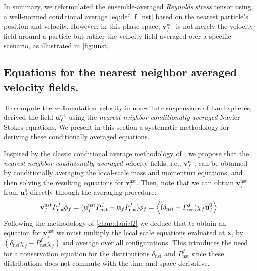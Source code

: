 In summary, we reformulated the ensemble-averaged \textit{Reynolds stress} tensor using a well-normed conditional average \eqref{eq:def_f_nst} based on the nearest particle's position and velocity. 
However, in this phase-space, $\textbf{v}_f^\text{nst}$ is not merely the velocity field around a particle but rather the velocity field averaged over a specific scenario, as illustrated in \ref{fig:unst}. 

\subsection{Equations for the nearest neighbor averaged velocity fields. }

To compute the sedimentation velocity in non-dilute suspensions of hard spheres, \citet[Appendix B]{zhang2021ensemble} derived the field $\textbf{u}_f^\text{nst}$ using the \textit{nearest neighbor conditionally averaged} Navier-Stokes equations. 
We present in this section a systematic methodology for deriving these conditionally averaged equations. 

Inspired by the classic conditional average methodology of \citet{hinch1977averaged}, we propose that the \textit{nearest neighbor conditionally averaged} velocity fields, i.e., $\textbf{v}_f^\text{nst}$, can be obtained by conditionally averaging the local-scale mass and momentum equations, and then solving the resulting equations for $\textbf{v}_f^\text{nst}$. 
Then, note that we can obtain $\textbf{v}_f^\text{nst}$ from $\textbf{u}_f^0$ directly through the averaging procedure: 
\begin{equation}
    \textbf{v}_f^\text{nst} P_\text{nst}^f\phi_f
    = 
    (\textbf{u}_f^\text{nst} P_\text{nst}^f
    - \textbf{u}_f P_\text{nst}^f)\phi_f
    = 
    \left<(\delta_\text{nst}  - P_\text{nst}^f)\chi_f\textbf{u}_f^0\right>
\end{equation}
Following the methodology of \ref{chap:daniel2} we deduce that to obtain an equation for $\textbf{v}_f^\text{nst}$ we must multiply the local scale equations evaluated at \textbf{x}, by $(\delta_\text{nst}\chi_f - P_\text{nst}^f\chi_f)$ and average over all configurations. 
This introduces the need for a conservation equation for the distributions $\delta_\text{nst}$ and $P_\text{nst}^f$ since these distributions does not commute with the time and space derivative. 

